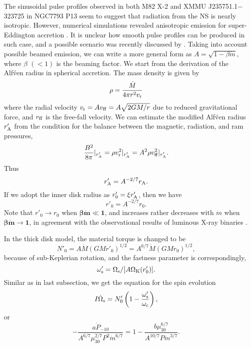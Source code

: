 \documentclass[12pt,preprint]{aastex}
\begin{document}
The sinusoidal pulse profiles observed in both M82 X-2 \citep{bhw2014} and XMMU J235751.1$-$323725 in NGC7793 P13 \citep{f2016} seem to suggest that radiation from the NS is nearly isotropic. However, numerical simulations revealed anisotropic emission for super-Eddington accretion \citep[e.g.,][]{o2007,kmoo2016}. It is unclear how smooth pulse profiles can be produced in such case, and a possible scenario was recently discussed by \citet{msti2016}.
Taking into account possible beamed emission, we can write a more general form as $A=\sqrt{1-\beta\dot{m}}$, where $\beta$ $(<1)$ is the beaming factor. We start from the derivation of the Alf\'ven radius in spherical accretion. The mass density is given by
\begin{equation}
\rho=\frac{\dot{M}}{4 \pi r^2 v_{\rm r}}
\end{equation}
where the radial velocity $v_{\rm r}=A v_{\rm ff}=A \sqrt{2GM/r}$ due to reduced gravitational force, and $v_{\rm ff}$ is the free-fall velocity.
We can estimate the modified Alf\'ven radius $r'_{\rm A}$ from the condition for the balance between the magnetic, radiation, and ram pressures,
\begin{equation}
\frac{B^2}{8 \pi}|_{r'_{\rm A}}=\rho v^2_{\rm r}|_{r'_{\rm A}}=A^2 \rho v^2_{\rm ff}|_{r'_{\rm A}}.
\end{equation}
Thus
\begin{equation}
r'_{\rm A}=A^{-2/7} r_{\rm A}.
\end{equation}
If we adopt the inner disk radius as $r'_0=\xi r'_{\rm A}$, then we have
\begin{equation}
r'_0=A^{-2/7} r_0.
\end{equation}
Note that $r'_0\rightarrow r_0$ when $\bm{\beta\dot{m}\ll 1}$, and increases rather decreases with $\dot{m}$ when $\bm{\beta\dot{m}\rightarrow 1}$, in agreement with the observational results of luminous X-ray binaries \citep{wz2011,wzz2014,cmcmbs2016}.

In the thick disk model, the material torque is changed to be
\begin{equation}
N'_0=A\dot{M}(GMr'_0)^{1/2}=A^{6/7}\dot{M}(GMr_0)^{1/2},
\end{equation}
because of sub-Keplerian rotation, and the fastness parameter is correspondingly,
\begin{equation}
\omega'_{\rm s}=\Omega_{\rm s}/[A\Omega_{\rm K}(r'_0)].
\end{equation}
Similar as in last subsection, we get the equation for the spin evolution
\begin{equation}
I\dot{\Omega}_{\rm s}=N'_0\left(1-\frac{\omega'_{\rm s}}{\omega_{\rm c}}\right),
\end{equation}
or
\begin{equation}
-\frac{a \dot{P}_{-10}}{A^{6/7}\mu_{30}^{2/7}P^2\dot{m}^{6/7}}
=1-\frac{b\mu_{30}^{6/7}}{A^{10/7}P\dot{m}^{3/7}}.
\end{equation}
\end{document}
